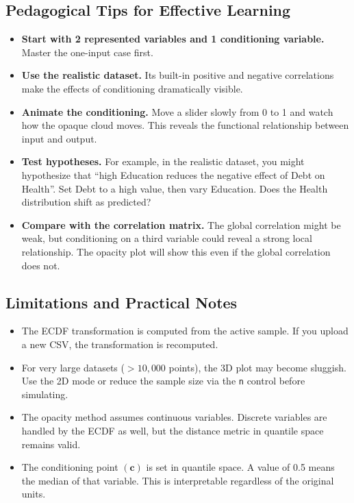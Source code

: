 \documentclass[12pt]{article}
\begin{document}
\subsection{Pedagogical Tips for Effective Learning}

\begin{itemize}
    \item \textbf{Start with 2 represented variables and 1 conditioning variable.} Master the one-input case first.
    \item \textbf{Use the realistic dataset.} Its built-in positive and negative correlations make the effects of conditioning dramatically visible.
    \item \textbf{Animate the conditioning.} Move a slider slowly from 0 to 1 and watch how the opaque cloud moves. This reveals the functional relationship between input and output.
    \item \textbf{Test hypotheses.} For example, in the realistic dataset, you might hypothesize that “high Education reduces the negative effect of Debt on Health”. Set Debt to a high value, then vary Education. Does the Health distribution shift as predicted?
    \item \textbf{Compare with the correlation matrix.} The global correlation might be weak, but conditioning on a third variable could reveal a strong local relationship. The opacity plot will show this even if the global correlation does not.
\end{itemize}

\subsection{Limitations and Practical Notes}

\begin{itemize}
    \item The ECDF transformation is computed from the active sample. If you upload a new CSV, the transformation is recomputed.
    \item For very large datasets (\(>10,000\) points), the 3D plot may become sluggish. Use the 2D mode or reduce the sample size via the \texttt{n} control before simulating.
    \item The opacity method assumes continuous variables. Discrete variables are handled by the ECDF as well, but the distance metric in quantile space remains valid.
    \item The conditioning point \((\mathbf{c})\) is set in quantile space. A value of 0.5 means the median of that variable. This is interpretable regardless of the original units.
\end{itemize}
\end{document}
